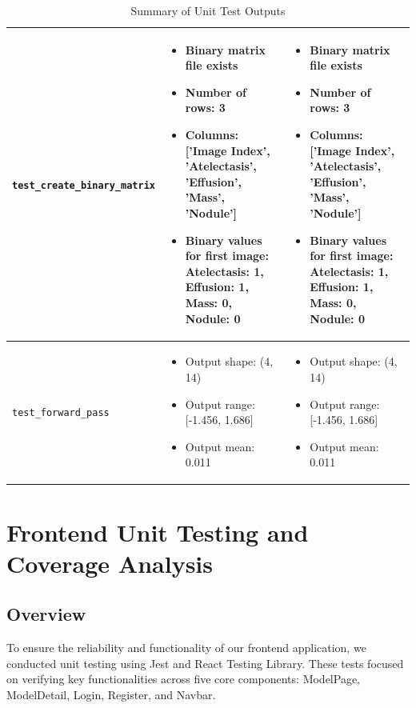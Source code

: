 \documentclass[12pt, titlepage]{article}
\begin{document}
\begin{table}[h!]
\begin{scriptsize}
\begin{tabular}{|p{4cm}|p{6cm}|p{6cm}|}
\texttt{test\_create\_binary\_matrix} & 
\begin{itemize}
    \item Binary matrix file exists
    \item Number of rows: 3
    \item Columns: ['Image Index', 'Atelectasis', 'Effusion', 'Mass', 'Nodule']
    \item Binary values for first image: Atelectasis: 1, Effusion: 1, Mass: 0, Nodule: 0
\end{itemize} & 
\begin{itemize}
    \item Binary matrix file exists
    \item Number of rows: 3
    \item Columns: ['Image Index', 'Atelectasis', 'Effusion', 'Mass', 'Nodule']
    \item Binary values for first image: Atelectasis: 1, Effusion: 1, Mass: 0, Nodule: 0
\end{itemize} \\
\hline
\texttt{test\_forward\_pass} & 
\begin{itemize}
    \item Output shape: (4, 14)
    \item Output range: [-1.456, 1.686]
    \item Output mean: 0.011
\end{itemize} & 
\begin{itemize}
    \item Output shape: (4, 14)
    \item Output range: [-1.456, 1.686]
    \item Output mean: 0.011
\end{itemize} \\
\hline
\end{tabular}
\caption{Summary of Unit Test Outputs}
\label{tab:unit-test-outputs}
\end{scriptsize}
\end{table}


\section{Frontend Unit Testing and Coverage Analysis}

\subsection{Overview}

To ensure the reliability and functionality of our frontend application, we conducted unit testing using Jest and React Testing Library. These tests focused on verifying key functionalities across five core components: ModelPage, ModelDetail, Login, Register, and Navbar.
\end{document}
